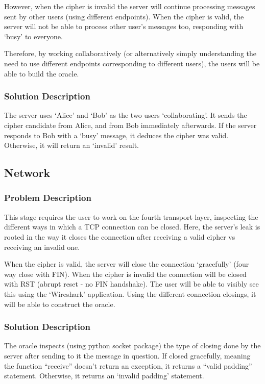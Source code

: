 \documentclass[sigconf]{acmart}
\begin{document}
However, when the cipher is invalid the server will continue processing messages sent by other users (using different endpoints). When the cipher is valid, the server will not be able to process other user’s messages too, responding with ‘busy’ to everyone.

Therefore, by working collaboratively (or alternatively simply understanding the need to use different endpoints corresponding to different users), the users will be able to build the oracle. 

\subsubsection{Solution Description}
The server uses ‘Alice’ and ‘Bob’ as the two users ‘collaborating’. It sends the cipher candidate from Alice, and from Bob immediately afterwards. If the server responds to Bob with a ‘busy’ message, it deduces the cipher was valid. Otherwise, it will return an ‘invalid’ result. 

\subsection{Network}
\subsubsection{Problem Description}
This stage requires the user to work on the fourth transport layer, inspecting the different ways in which a TCP connection can be closed. 
Here, the server’s leak is rooted in the way it closes the connection after receiving a valid cipher vs receiving an invalid one.

When the cipher is valid, the server will close the connection ‘gracefully’ (four way close with FIN). When the cipher is invalid the connection will be closed with RST (abrupt reset - no FIN handshake). The user will be able to visibly see this using the ‘Wireshark’ application.  Using the different connection closings, it will be able to construct the oracle. 

\subsubsection{Solution Description}
The oracle inspects (using python socket package) the type of closing done by the server after sending to it the message in question. If closed gracefully, meaning the function “receive” doesn’t return an exception, it returns a “valid padding” statement. Otherwise, it returns an ‘invalid padding’ statement. 
\end{document}
